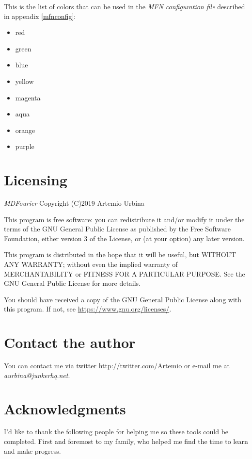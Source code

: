 \documentclass[10pt,a4paper]{report}
\begin{document}
\begin{appendices}
This is the list of colors that can be used in the \textit{MFN configuration file} described in appendix \ref{mfnconfig}: 

\begin{itemize}
	\item red
	\item green
	\item blue
	\item yellow
	\item magenta
	\item aqua
	\item orange
	\item purple
\end{itemize}

\chapter{Licensing}
\label{license}

\textit{MDFourier} Copyright (C)2019 Artemio Urbina

This program is free software: you can redistribute it and/or modify
it under the terms of the GNU General Public License as published by
the Free Software Foundation, either version 3 of the License, or
(at your option) any later version.

This program is distributed in the hope that it will be useful,
but WITHOUT ANY WARRANTY; without even the implied warranty of
MERCHANTABILITY or FITNESS FOR A PARTICULAR PURPOSE.  See the
GNU General Public License for more details.

You should have received a copy of the GNU General Public License
along with this program.  If not, see \url{https://www.gnu.org/licenses/}.	

\chapter{Contact the author}
\label{contact}

You can contact me via twitter \url{http://twitter.com/Artemio} or e-mail me at \textit{aurbina@junkerhq.net}.

\chapter{Acknowledgments}

I'd like to thank the following people for helping me so these tools could be completed. First and foremost to my family, who helped me find the time to learn and make progress.

\end{appendices}
\end{document}
